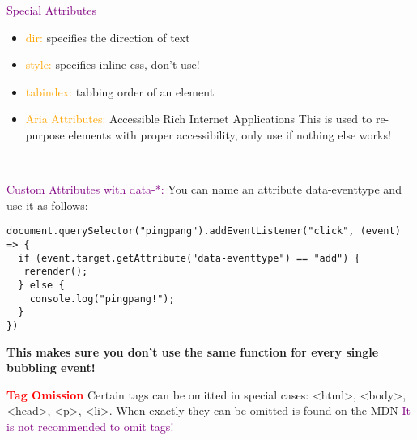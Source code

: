 \documentclass[main.tex,fontsize=6pt,paper=a4,paper=landscape,DIV=calc,]{scrartcl}
\begin{document}
\begin{multicols*}{4}
\textcolor{purple}{Special Attributes}
\begin{itemize}
\item \textcolor{orange}{dir:} specifies the direction of text
\item \textcolor{orange}{style:} specifies inline css, don't use!
\item \textcolor{orange}{tabindex:} tabbing order of an element
\item \textcolor{orange}{Aria Attributes:} Accessible Rich Internet Applications\newline
  This is used to re-purpose elements with proper accessibility, only use if nothing else works!
\end{itemize} 
\, \newline

\textcolor{purple}{Custom Attributes with data-*:}\newline
You can name an attribute data-eventtype and use it as follows:
\vspace{-2mm}
\begin{lstlisting}
document.querySelector("pingpang").addEventListener("click", (event) => { 
  if (event.target.getAttribute("data-eventtype") == "add") {
   rerender();
  } else {
    console.log("pingpang!");
  }
})
\end{lstlisting}
\vspace{2mm}
\textbf{This makes sure you don't use the same function for every single bubbling event!}\newline
\, \newline

\textbf{\textcolor{red}{Tag Omission}}\newline 
Certain tags can be omitted in special cases:\newline
<html>, <body>, <head>, <p>, <li>.\newline
When exactly they can be omitted is found on the MDN\newline
\textcolor{purple}{It is not recommended to omit tags!}









\end{multicols*}
\end{document}
